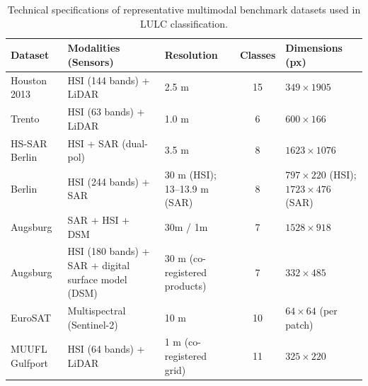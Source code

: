 \documentclass[]{interact}
\theoremstyle{plain}%
\theoremstyle{definition}
\theoremstyle{remark}
\DeclareRobustCommand{\DIFadd}[1]{{\protect\color{DIFaddcolor}\uwave{#1}}}
\DeclareRobustCommand{\DIFdel}[1]{{\protect\color{DIFdelcolor}\sout{#1}}}
\def\DIFadd#1{#1}%
\def\DIFdel#1{}%
\begin{document}
\begin{table}[!htbp]
	\centering
	\setlength{\belowcaptionskip}{8pt}
	\caption{Technical specifications of \DIFdel{the} \DIFdel{five} \DIFdel{most} \DIFdel{utilized} \DIFadd{representative} \DIFadd{multimodal} benchmark datasets \DIFadd{used} in LULC \DIFdel{fusion} \DIFdel{research} \DIFadd{classification}.}
	\label{tab:datasets_detail}
	\scriptsize
	\setlength{\tabcolsep}{3pt}
	\renewcommand{\arraystretch}{1.25}
	\begin{tabular}{@{} p{1.8cm} p{3.5cm} p{3.2cm} c p{3.5cm} @{}}
		\toprule
		\textbf{Dataset} & \textbf{Modalities (Sensors)} & \textbf{Resolution} & \textbf{Classes} & \textbf{Dimensions (px)} \\ 
		\midrule
Houston 2013 & HSI (144 bands) + LiDAR & 2.5 m & 15 & $349 \times 1905$ \\
Trento & HSI (\DIFdel{6}\hspace{0.33em}\DIFadd{63} bands) + LiDAR & 1.0 m & 6 & $600 \times 166$ \\
\textcolor{DIFdelcolor}{HS-SAR Berlin} & \textcolor{DIFdelcolor}{HSI + SAR (dual-pol)} & \textcolor{DIFdelcolor}{3.5 m} & \textcolor{DIFdelcolor}{8} & \textcolor{DIFdelcolor}{$1623 \times 1076$} \\
\textcolor{DIFaddcolor}{Berlin} & \textcolor{DIFaddcolor}{HSI (244 bands) + SAR} & \textcolor{DIFaddcolor}{30 m (HSI); 13--13.9 m (SAR)} & \textcolor{DIFaddcolor}{8} & \textcolor{DIFaddcolor}{$797 \times 220$ (HSI); $1723 \times 476$ (SAR)} \\
\textcolor{DIFdelcolor}{Augsburg} & \textcolor{DIFdelcolor}{SAR + HSI + DSM} & \textcolor{DIFdelcolor}{30m / 1m} & \textcolor{DIFdelcolor}{7} & \textcolor{DIFdelcolor}{$1528 \times 918$} \\
\textcolor{DIFaddcolor}{Augsburg} & \textcolor{DIFaddcolor}{HSI (180 bands) + SAR + digital surface model (DSM)} & \textcolor{DIFaddcolor}{30 m (co-registered products)} & \textcolor{DIFaddcolor}{7} & \textcolor{DIFaddcolor}{$332 \times 485$} \\
\textcolor{DIFdelcolor}{EuroSAT} & \textcolor{DIFdelcolor}{Multispectral (Sentinel-2)} & \textcolor{DIFdelcolor}{10 m} & \textcolor{DIFdelcolor}{10} & \textcolor{DIFdelcolor}{$64 \times 64$ (per patch)} \\
\textcolor{DIFaddcolor}{MUUFL Gulfport} & \textcolor{DIFaddcolor}{HSI (64 bands) + LiDAR} & \textcolor{DIFaddcolor}{1 m (co-registered grid)} & \textcolor{DIFaddcolor}{11} & \textcolor{DIFaddcolor}{$325 \times 220$} \\
\bottomrule
	\end{tabular}
\end{table}
\end{document}
